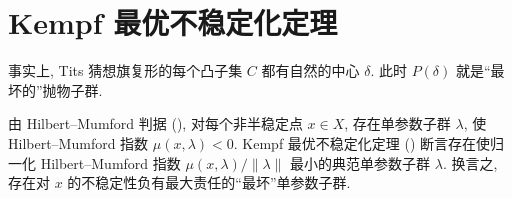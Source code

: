 \section{Kempf 最优不稳定化定理}\label{src:8.6}
\begin{epigraph}
事实上, Tits 猜想旗复形的每个凸子集 $C$ 都有自然的中心 $\delta$. 此时 $P(\delta)$ 就是``最坏的''抛物子群.
\end{epigraph}
由 Hilbert--Mumford 判据 (), 对每个非半稳定点 $x\in X$, 存在单参数子群 $\lambda$, 使 Hilbert--Mumford 指数 $\mu(x,\lambda)<0$. Kempf 最优不稳定化定理 () 断言存在使归一化 Hilbert--Mumford 指数 $\mu(x,\lambda)/\|\lambda\|$ 最小的典范单参数子群 $\lambda$. 换言之, 存在对 $x$ 的不稳定性负有最大责任的``最坏''单参数子群.
